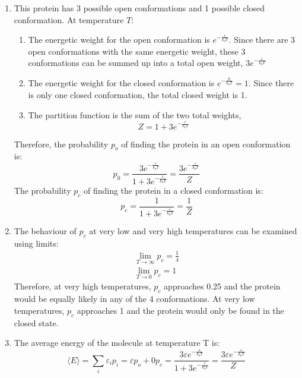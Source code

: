 \begin{enumerate}
    \item This protein has 3 possible open conformations and 1 possible closed conformation. At temperature $T$:\\
   \begin{enumerate}
       \item The energetic weight for the open conformation is $e^{-\frac{\varepsilon}{k_{b}T}}$. Since there are 3 open conformations with the same energetic weight, these 3 conformations can be summed up into a total open weight, $3e^{-\frac{\varepsilon}{k_{b}T}}$
       \item The energetic weight for the closed conformation is $
           e^{-\frac{0}{k_{b}T}} = 1.$
           Since there is only one closed conformation, the total closed weight is 1.
       \item The partition function is the sum of the two total weights, \begin{equation*}
          Z=1+3e^{-\frac{\varepsilon}{k_{b}T}}
       \end{equation*}
   \end{enumerate} 
   Therefore, the probability $p_{o}$ of finding the protein in an open conformation is:
   \begin{equation*}
       p_{0}=\frac{3e^{-\frac{\varepsilon}{k_{b}T}}}{1+3e^{-\frac{\varepsilon}{k_{b}T}}}=\frac{3e^{-\frac{\varepsilon}{k_{b}T}}}{Z}
   \end{equation*}
   The probability $p_{c}$ of finding the protein in a closed conformation is:
   \begin{equation*}
       p_{c}=\frac{1}{1+3e^{-\frac{\varepsilon}{k_{b}T}}}=\frac{1}{Z}
   \end{equation*}
   \item The behaviour of $p_{c}$ at very low and very high temperatures can be examined using limits:
      \begin{align*}
       \lim_{T\to\infty} p_{c}=\frac{1}{4}\\
       \lim_{T\to0} p_{c}=1
      \end{align*}
      Therefore, at very high temperatures, $p_{c}$ approaches 0.25 and the protein would be equally likely in any of the 4 conformations. At very low temperatures, $p_{c}$ approaches 1 and the protein would only be found in the closed state.
      \item 
      The average energy of the molecule at temperature T is: $$\langle E\rangle=\sum_{i}\varepsilon_{i}p_{i}=\varepsilon p_{o}+0p_{c}=\frac{3\varepsilon e^{-\frac{\varepsilon}{k_{b}T}}}{1+3e^{-\frac{\varepsilon}{k_{b}T}}}=\frac{3\varepsilon e^{-\frac{\varepsilon}{k_{b}T}}}{Z}$$
\end{enumerate}